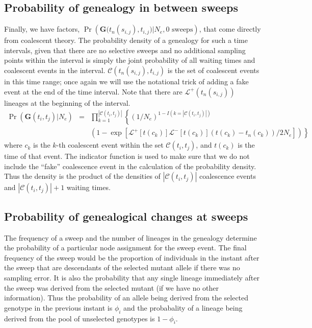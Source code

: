 \documentclass[letterpaper]{article}
\newcommand{\sweeptime}[1]{{\ensuremath{t_{#1}}}}
\newcommand{\sweepfreq}[1]{{\ensuremath{\phi_{#1}}}}
\newcommand{\genealogy}{{\ensuremath{\mathbf{G}}}}
\newcommand{\popsize}{{\ensuremath{N_e}}}
\newcommand{\lineagesAfter}{{\ensuremath{\mathcal{L}^{+}}}}
\newcommand{\lineagesBefore}{{\ensuremath{\mathcal{L}^{-}}}}
\newcommand{\coalescences}[2]{{\ensuremath{\mathcal{C}({#1},{#2})}}}
\newcommand{\timeNext}[1]{{\ensuremath{t_n(#1)}}}
\begin{document}
\subsection{Probability of genealogy in between sweeps}
Finally, we have factors, $\Pr\left(\genealogy\Big(\timeNext{s_{i,j}},\sweeptime{i,j}\Big) \Big|\popsize,\mbox{0 sweeps}\right)$, that come directly from coalescent theory. 
The probability density of a genealogy for such a time intervals, given that there are no selective sweeps and no additional sampling points within the interval is simply the joint probability of all waiting times and coalescent events in the interval.
$\coalescences{\timeNext{s_{i,j}}}{\sweeptime{i,j}}$ is the set of coalescent events in this time range; once again we will use the notational trick of adding a fake event at the end of the time interval.
Note that there are $\lineagesAfter(\timeNext{s_{i,j}})$ lineages at the beginning of the interval.
\begin{eqnarray}
\Pr\left(\genealogy(t_i,t_j) \Big|\popsize\right)  & = & \prod_{k = 1}^{|\coalescences{t_i}{t_j}|}\left\{\left(1/\popsize\right)^{1-I(k =|\coalescences{t_i}{t_j}|)} \right.\\
	&& \left. \left(1-\exp\left[\lineagesAfter[t(c_k)]\lineagesBefore[t(c_k)] (t(c_k)-\timeNext{c_k})/2\popsize\right]\right)\right\}
\end{eqnarray}
where $c_k$ is the $k$-th coalescent event within the set $\coalescences{t_i}{t_j}$, and $t(c_k)$ is the time of that event.
The indicator function is used to make sure that we do not include the ``fake'' coalescence event in the calculation of the probability density.
Thus the density is the product of the densities of $|\coalescences{t_i}{t_j}|$ coalescence events and $|\coalescences{t_i}{t_j}|+1$ waiting times.

\subsection{Probability of genealogical changes at sweeps}
The frequency of a sweep and the number of lineages in the genealogy determine the probability of a particular node assignment for the sweep event.
The final frequency of the sweep would be the proportion of individuals in the instant after the sweep that are descendants 
of the selected mutant allele if there was no sampling error.
It is also the probability that any single lineage immediately after the sweep was derived from the selected mutant (if we have no other information).
Thus the probability of an allele being derived from the selected genotype in the previous instant is 
$\sweepfreq{i}$ and the probabality of a lineage being derived from the pool of unselected genotypes 
is $1-\sweepfreq{i}$.
\end{document}
